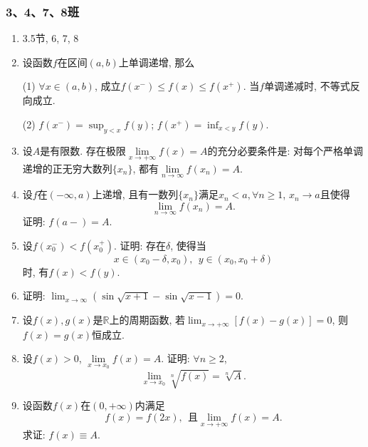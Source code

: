 \documentclass[UTF8,11pt, a4paper, oneside, fontset=none]{ctexbook}
\begin{document}
\subsubsection*{3、4、7、8班}
\begin{enumerate}

\item 3.5节, 6, 7, 8

\item 设函数$f$在区间$(a, b)$上单调递增, 那么

(1) $\forall x \in (a, b)$, 成立$f(x^-) \leq f(x) \leq f(x^+)$. 当$f$单调递减时, 不等式反向成立.

(2) $f(x^-) = \sup_{y < x} f(y)$;  $f(x^+) = \inf_{x< y} f(y)$.

\item 设$A$是有限数. 存在极限$\lim\limits_{x \to +\infty}f(x) =A$的充分必要条件是: 对每个严格单调递增的正无穷大数列$\{x_n\}$, 都有$\lim\limits_{n \to \infty}f(x_n) =A$.

\item 设$f$在$(-\infty, a)$上递增, 且有一数列$\{x_n\}$满足$x_n < a, \forall n \geq 1$, $x _n \to a$且使得
\[
\lim_{n \to \infty}f(x_n) =A.
\]
证明: $f(a-)=A$.

\item 设$f(x_0^-) < f(x_0^+)$. 证明: 存在$\delta$, 使得当
\[
x \in (x_0 - \delta, x_0), \ \ y \in (x_0, x_0 + \delta)
\]
时, 有$f(x) < f(y)$.

\item 证明: $\lim_{x \to \infty}(\sin \sqrt{x+1} - \sin \sqrt{x-1}) =0$.

\item 设$f(x), g(x)$是$\mathbb R$上的周期函数, 若$\lim_{x \to +\infty}[f(x) -g(x)] =0$, 则$f(x) = g(x)$恒成立.

\item 设$f(x) > 0$, $\lim\limits_{x \to x_0} f(x) = A$. 证明: $\forall n \geq 2$,
\[
\lim_{x \to x_0} \sqrt[n]{f(x)} = \sqrt[n]{A}.
\]

\item 设函数$f(x)$在$(0, +\infty)$内满足
\[
f(x) = f(2x), \ \ \mbox{且} \lim_{x \to +\infty}f(x) = A.
\]
求证: $f(x) \equiv A$.

\end{enumerate}
\end{document}
